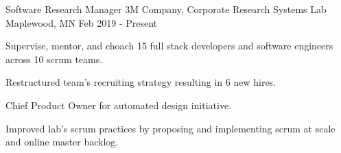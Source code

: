 

\begin{cventries}

  \cventry
    {Software Research Manager} %
    {3M Company, Corporate Research Systems Lab} %
    {Maplewood, MN} %
    {Feb 2019 - Present} %
    {
      \begin{cvitems} %
      \item {Supervise, mentor, and choach 15 full stack developers and software engineers across 10 scrum
          teams.}
       \item {Restructured team's recruiting strategy resulting in 6 new hires.}
       \item {Chief Product Owner for automated design initiative.}
       \item {Improved lab's scrum practices by proposing and implementing scrum at scale
           and online master backlog.}
      \end{cvitems}
    }


\end{cventries}
